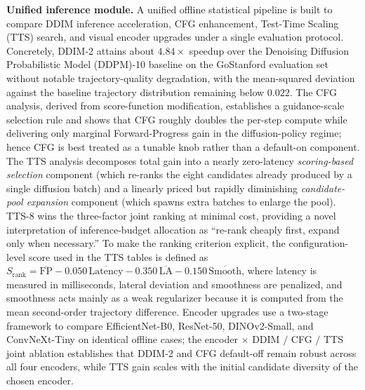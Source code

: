\begin{digest}[en]
\textbf{Unified inference module.} A unified offline statistical pipeline is built to compare
DDIM inference acceleration, CFG enhancement, Test-Time Scaling (TTS) search, and visual encoder upgrades under a single evaluation protocol.
Concretely, DDIM-2 attains about $4.84\times$ speedup over the Denoising Diffusion Probabilistic Model (DDPM)-10 baseline on the
GoStanford evaluation set without notable trajectory-quality degradation, with the
mean-squared deviation against the baseline trajectory distribution remaining below
$0.022$. The CFG analysis, derived from score-function modification, establishes a
guidance-scale selection rule and shows that CFG roughly doubles the per-step compute
while delivering only marginal Forward-Progress gain in the diffusion-policy regime;
hence CFG is best treated as a tunable knob rather than a default-on component. The
TTS analysis decomposes total gain into a nearly zero-latency \emph{scoring-based
selection} component (which re-ranks the eight candidates already produced by a single
diffusion batch) and a linearly priced but rapidly diminishing \emph{candidate-pool
expansion} component (which spawns extra batches to enlarge the pool). TTS-8 wins the
three-factor joint ranking at minimal cost, providing a novel interpretation of
inference-budget allocation as ``re-rank cheaply first, expand only when necessary.''
To make the ranking criterion explicit, the configuration-level score used in the
TTS tables is defined as
$S_{\mathrm{rank}}=\overline{\mathrm{FP}}-0.050\,\overline{\mathrm{Latency}}
-0.350\,\overline{\mathrm{LA}}-0.150\,\overline{\mathrm{Smooth}}$,
where latency is measured in milliseconds, lateral deviation and smoothness are
penalized, and smoothness acts mainly as a weak regularizer because it is computed
from the mean second-order trajectory difference.
Encoder upgrades use a two-stage framework to compare EfficientNet-B0, ResNet-50,
DINOv2-Small, and ConvNeXt-Tiny on identical offline cases; the encoder $\times$ DDIM
$/$ CFG $/$ TTS joint ablation establishes that DDIM-2 and CFG default-off remain
robust across all four encoders, while TTS gain scales with the initial candidate
diversity of the chosen encoder.


\end{digest}
